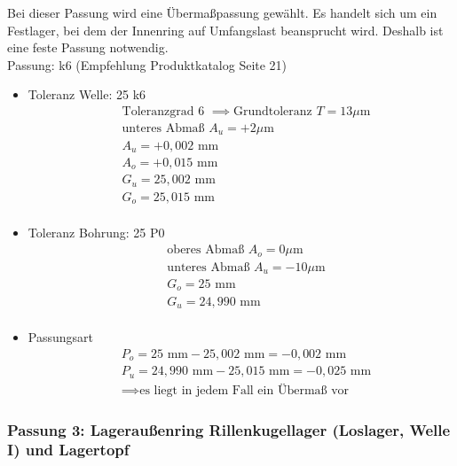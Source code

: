 Bei dieser Passung wird eine Übermaßpassung gewählt. Es handelt sich um ein Festlager, bei dem der Innenring auf Umfangslast beansprucht wird. Deshalb ist eine feste Passung notwendig. \\ 
Passung: k6 (Empfehlung Produktkatalog Seite 21)
\begin{itemize}
	\item Toleranz Welle: 25 k6
	\begin{align*}
	&\text{Toleranzgrad 6 } \implies \text{Grundtoleranz } T=13 \mu\text{m} \\
	&\text{unteres Abmaß } A_u = +2 \mu\text{m} \\
	&A_u = +0,002 \text{ mm} \\
	&A_o = +0,015 \text{ mm} \\
	&G_u = 25,002 \text{ mm} \\
	&G_o = 25,015 \text{ mm}\\
	\end{align*} 
	\item Toleranz Bohrung: 25 P0 
	\begin{align*}
	&\text{oberes Abmaß } A_o = 0 \mu\text{m} \\
	&\text{unteres Abmaß } A_u = -10 \mu\text{m} \\
	&G_o = 25 \text{ mm} \\
	&G_u = 24,990 \text{ mm}\\
	\end{align*} 
	\item Passungsart
	\begin{align*}
	&P_o = 25 \text{ mm} - 25,002 \text{ mm} = -0,002 \text{ mm} \\
	&P_u = 24,990 \text{ mm} - 25,015 \text{ mm} =-0,025 \text{ mm}\\
	&\implies \text{es liegt in jedem Fall ein Übermaß vor}
	\end{align*} 
\end{itemize}
\newpage

\subsubsection{Passung 3: Lageraußenring Rillenkugellager (Loslager, Welle I) und Lagertopf}

